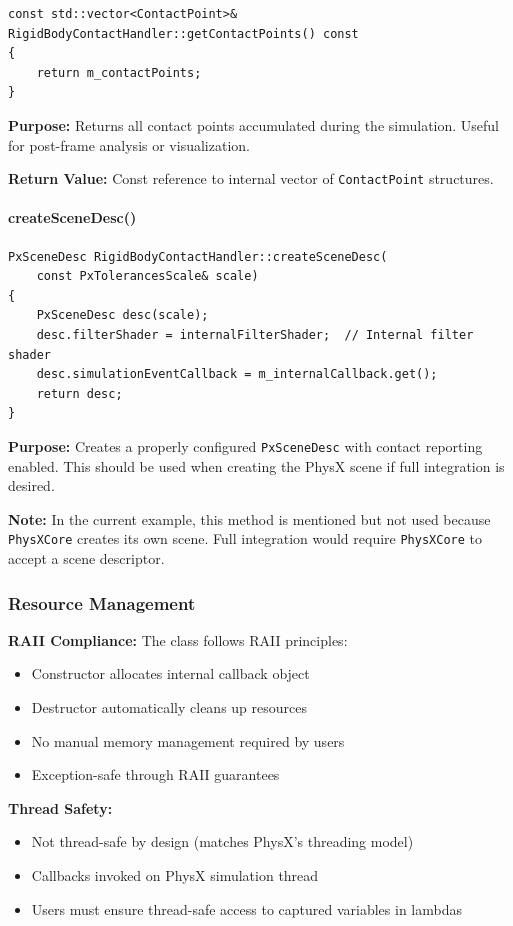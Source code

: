 \begin{lstlisting}[style=cpp]
const std::vector<ContactPoint>&
RigidBodyContactHandler::getContactPoints() const
{
    return m_contactPoints;
}
\end{lstlisting}

\textbf{Purpose:} Returns all contact points accumulated during the simulation. Useful for post-frame analysis or visualization.

\textbf{Return Value:} Const reference to internal vector of \texttt{ContactPoint} structures.

\paragraph{createSceneDesc()}

\begin{lstlisting}[style=cpp]
PxSceneDesc RigidBodyContactHandler::createSceneDesc(
    const PxTolerancesScale& scale)
{
    PxSceneDesc desc(scale);
    desc.filterShader = internalFilterShader;  // Internal filter shader
    desc.simulationEventCallback = m_internalCallback.get();
    return desc;
}
\end{lstlisting}

\textbf{Purpose:} Creates a properly configured \texttt{PxSceneDesc} with contact reporting enabled. This should be used when creating the PhysX scene if full integration is desired.

\textbf{Note:} In the current example, this method is mentioned but not used because \texttt{PhysXCore} creates its own scene. Full integration would require \texttt{PhysXCore} to accept a scene descriptor.

\subsubsection{Resource Management}

\textbf{RAII Compliance:} The class follows RAII principles:
\begin{itemize}
    \item Constructor allocates internal callback object
    \item Destructor automatically cleans up resources
    \item No manual memory management required by users
    \item Exception-safe through RAII guarantees
\end{itemize}

\textbf{Thread Safety:}
\begin{itemize}
    \item Not thread-safe by design (matches PhysX's threading model)
    \item Callbacks invoked on PhysX simulation thread
    \item Users must ensure thread-safe access to captured variables in lambdas
\end{itemize}

